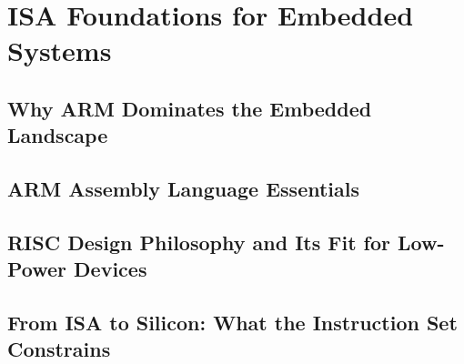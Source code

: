 \chapter{ISA Foundations for Embedded Systems}
\label{ch:isa}


\section{Why ARM Dominates the Embedded Landscape}

\section{ARM Assembly Language Essentials}

\section{RISC Design Philosophy and Its Fit for Low-Power Devices}

\section{From ISA to Silicon: What the Instruction Set Constrains}
